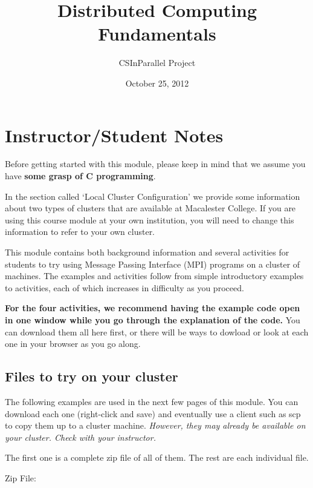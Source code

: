 \documentclass[letterpaper,10pt,openany,oneside]{sphinxmanual}
\title{Distributed Computing Fundamentals}
\date{October 25, 2012}
\author{CSInParallel Project}
\begin{document}
\maketitle
\tableofcontents
{}\label{index::doc}



\chapter{Instructor/Student Notes}
\label{Prerequisites/Prerequisites:distributed-computing-fundamentals}\label{Prerequisites/Prerequisites:instructor-student-notes}\label{Prerequisites/Prerequisites::doc}
Before getting started with this module, please keep in mind that we assume you have \textbf{some grasp of C programming}.

In the section called `Local Cluster Configuration' we provide some information about two types of clusters that are available at Macalester College.  If you are using this course module at your own institution, you will need to change this information to refer to your own cluster.

This module contains both background information and several activities for students to try using Message Passing Interface (MPI) programs on a cluster
of machines.  The examples and activities follow from simple introductory examples to activities, each of which increases in difficulty as you proceed.

\textbf{For the four activities, we recommend having the example code open in one window while you go through the explanation of the code.}  You can download them all here first, or there will be ways to dowload or look at each one in your browser as you go along.


\section{Files to try on your cluster}
\label{Prerequisites/Prerequisites:files-to-try-on-your-cluster}
The following examples are used in the next few pages of this module.  You can download each one (right-click and save) and eventually use a client such as scp to copy them up to a cluster machine.  \emph{However, they may already be available on your cluster. Check with your instructor.}

The first one is a complete zip file of all of them. The rest are each individual file.

Zip File:
\end{document}
